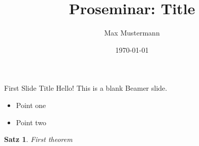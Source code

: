\documentclass{beamer}
\title{Proseminar: Title}
\author{Max Mustermann}
\date{\today}
\newtheorem{thm}{Satz}
\begin{document}
\begin{frame}
    \titlepage
\end{frame}

\begin{frame}{First Slide Title}
    Hello! This is a blank Beamer slide.
    \begin{itemize}
        \item Point one
        \item Point two
    \end{itemize}
    \begin{thm}
        First theorem
    \end{thm}
\end{frame}
\end{document}
